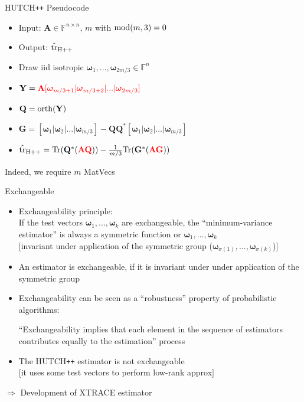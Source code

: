 \documentclass{beamer}
\newcommand{\bgk}[1]{\boldsymbol{#1}}
\newcommand{\bomega}{\bgk{\omega}}
\newcommand{\bvec}[1]{\mathbf{#1}}
\newcommand{\vA}{\bvec{A}}
\newcommand{\vG}{\bvec{G}}
\newcommand{\vQ}{\bvec{Q}}
\newcommand{\vY}{\bvec{Y}}
\newcommand{\bitem}{\item[$\bullet$]}
\begin{document}
\begin{frame}{H\small{UTCH\texttt{++}} Pseudocode}

\begin{itemize}
    \bitem Input: $\vA\in\mathbb{F}^{n\times n}$, $m$ with ${\rm mod}(m,3) = 0$ 
    \bitem Output: $\hat{\rm tr}_{{\rm H}++}$
    \bitem Draw iid isotropic $\bomega_1,...,\bomega_{2m/3}\in\mathbb{F}^n$
    \bitem $\vY = \textcolor{red}{\vA[\bomega_{m/3 + 1}|\bomega_{m/3 + 2}|...|\bomega_{2m/3}]}$
    \bitem $\vQ = {\rm orth}(\vY)$
    \bitem $\vG = [\bomega_{1}|\bomega_{2}|...|\bomega_{m/3}] - \vQ \vQ^*[\bomega_{1}|\bomega_{2}|...|\bomega_{m/3}] $
    \bitem $\hat{\rm tr}_{{\rm H}++} = {\rm Tr}(\vQ^* (\textcolor{red}{\vA \vQ}))
 - \frac{1}{m/3} {\rm Tr}(\vG^* (\textcolor{red}{\vA \vG}))$
\end{itemize}

Indeed, we require $m$ MatVecs
\end{frame}

\begin{frame}{Exchangeable}

\begin{itemize}
    \bitem Exchangeability principle:\\
    If the test vectors $\bomega_1,...,\bomega_k$ are exchangeable, the ``minimum-variance estimator'' is always a symmetric function or $\bomega_1,...,\bomega_k$\\
    $[$invariant under application of the symmetric group ($\bomega_{\sigma(1)},...,\bomega_{\sigma(k)}$)$]$
    \bitem An estimator is exchangeable, if it is invariant under under application of the symmetric group
    \bitem Exchangeability can be seen as a ``robustness'' property of probabilistic algorithms:\\
    \begin{center}
    ``Exchangeability implies that each element in the sequence of estimators contributes equally to the estimation'' process
    \end{center}
    \pause 
    \bitem The H{\footnotesize UTCH\texttt{++}} estimator is not exchangeable\\
    $[$it uses some test vectors to perform low-rank approx$]$
\end{itemize}
\begin{center}
    $\Rightarrow$ Development of XT{\footnotesize RACE} estimator
\end{center}
\end{frame}
\end{document}
